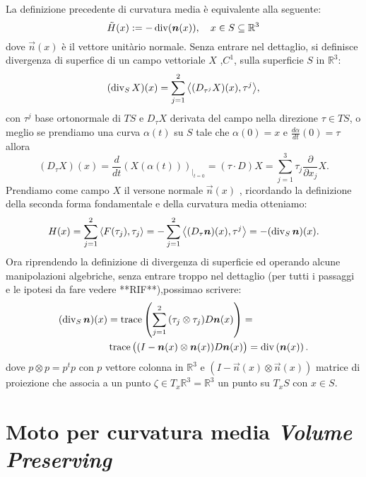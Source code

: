 \begin{osservazione}
La definizione precedente di curvatura media è equivalente alla seguente:
\begin{equation}
  \label{eq:cp-114}
  \tilde{H}(x):= -\operatorname{div}(\bm{n}(x)), \quad x\in S\subseteq\mathbb{R}^3
\end{equation}
dove $\vec{n}(x)$ è il vettore unitàrio normale. Senza entrare nel dettaglio, si definisce divergenza di superfice di un campo vettoriale $X$ ,$C^1$, sulla superficie $S$ in $\mathbb{R}^3$:
\[
(\operatorname{div}_{S}X)(x) = \sum_{j=1}^{2}{\left<(D_{\tau^j} X)(x),\tau^j\right>},
\]
con $\tau^j$ base ortonormale di $TS$ e $D_\tau X$ derivata del campo nella direzione $\tau\in TS$, o meglio se prendiamo una curva $\alpha(t)$ su $S$ tale che $\alpha(0) = x$ e $\frac{d\alpha}{dt}(0)=\tau$ allora
\[
(D_\tau X)(x)=\frac{d}{dt}\left(X(\alpha(t))\right)_{\big|_{t=0}} =(\tau\cdot D)X=\sum_{j=1}^3\tau_j\frac{\partial}{\partial x_j}X.
\]
Prendiamo come campo $X$ il versone normale $\vec{n}(x)$ , ricordando la definizione della seconda forma fondamentale e della curvatura media otteniamo:
\[
H(x)= \sum_{j=1}^{2}{\left<F(\tau_j),\tau_j\right>} = -\sum_{j=1}^{2}{\left<(D_\tau \bm{n})(x),\tau^j\right>}=-(\operatorname{div}_{S}\bm{n})(x).
\]
Ora riprendendo la definizione di divergenza di superficie ed operando alcune manipolazioni algebriche, senza entrare troppo nel dettaglio (per tutti i passaggi e le ipotesi da fare vedere **RIF**),possimao scrivere:
\[
\begin{aligned}
(\operatorname{div}_{S}\bm{n})(x) &= \operatorname{trace}\left(\sum_{j=1}^2{(\tau_j\otimes\tau_j)}D\bm{n}(x)\right)=\\
&\operatorname{trace}\big((I-\bm{n}(x)\otimes\bm{n}(x))D\bm{n}(x)\big)=\operatorname{div}\left(\bm{n}(x)\right).
\end{aligned}
\]
dove $p\otimes p=p^tp$ con $p$ vettore colonna in $\mathbb{R}^3$ e $(I-\vec{n}(x)\otimes\vec{n}(x))$ matrice di proiezione che associa a un punto $\zeta \in T_x\mathbb{R}^3=\mathbb{R}^3$ un punto su $T_xS$ con $x\in S$.
\end{osservazione}
%
%
\section{Moto per curvatura media \emph{Volume Preserving}}

